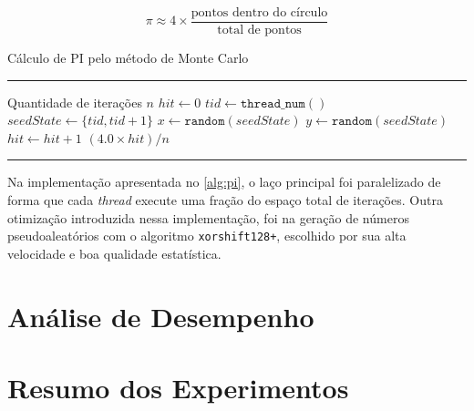 \begin{equation}
	\label{eq:pi_monte}
	\pi \approx 4 \times \frac{\text{pontos dentro do círculo}}{\text{total de pontos}}
\end{equation}

\begin{algorithm}[htb]
	\caption{Cálculo de PI pelo método de Monte Carlo}
	\label{alg:pi}
	\hrule
	\begin{algorithmic}[1]
		\REQUIRE Quantidade de iterações $n$
		\STATE $hit \gets 0$
		\STATE $tid \gets \texttt{thread\_num}()$
		\STATE $seedState \gets \{tid, tid + 1\}$
		\STATE $x \gets \texttt{random}(seedState)$
		\STATE $y \gets \texttt{random}(seedState)$
		\STATE $hit \gets hit + 1$
		\ENDIF
		\ENDFOR
		\RETURN $(4.0 \times hit) / n$
	\end{algorithmic}
	\hrule
	\fonte{}
\end{algorithm}

Na implementação apresentada no \autoref{alg:pi}, o laço principal foi paralelizado de forma que cada \textit{thread} execute uma fração do espaço total de iterações. Outra otimização introduzida nessa implementação, foi na geração de números pseudoaleatórios com o algoritmo \texttt{xorshift128+}, escolhido por sua alta velocidade e boa qualidade estatística.

\section{Análise de Desempenho}\label{sec:desempenho}

\section{Resumo dos Experimentos}\label{sec:resumo_exp}
